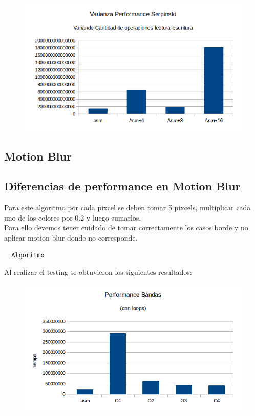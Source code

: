 \documentclass[a4paper]{article}
\begin{document}
\begin{figure}[h!]
  \begin{center}
  \includegraphics[scale=0.66]{Graficos1.5/sie/pushpop/var.png}
  \label{nombreparareferenciar1}
  \end{center}
\end{figure}


\newpage
\subsection{Motion Blur}
\subsection{Diferencias de performance en Motion Blur}
Para este algoritmo por cada pixcel se deben tomar 5 pixcels, multiplicar cada uno de los colores por 0.2 y luego sumarlos.
\\
Para ello devemos tener cuidado de tomar correctamente los casos borde y no aplicar motion blur donde no corresponde.

\begin{codesnippet}
\begin{verbatim}
  Algoritmo
\end{verbatim}
\end{codesnippet}

Al realizar el testing se obtuvieron los siguientes resultados:

\begin{figure}[h!]
  \begin{center}
  \includegraphics[scale=0.66]{Graficos1.4/ban/PSO.png}
  \label{nombreparareferenciar11}
  \end{center}
\end{figure}
\end{document}
